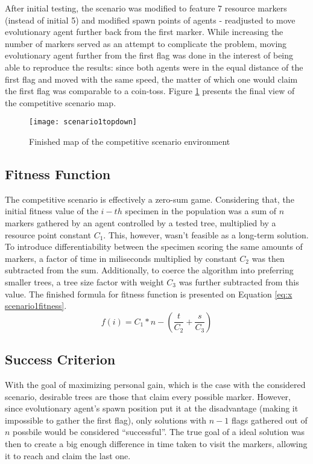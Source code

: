 After initial testing, the scenario was modified to feature 7 resource markers (instead of initial 5) and modified spawn points of agents -  readjusted to move evolutionary agent further back from the first marker. While increasing the number of markers served as an attempt to complicate the problem, moving evolutionary agent further from the first flag was done in the interest of being able to reproduce the results: since both agents were in the equal distance of the first flag and moved with the same speed, the matter of which one would claim the first flag was comparable to a coin-toss. Figure \ref{fig:x scenario1topdown} presents the final view of the competitive scenario map.

\begin{figure}[h]
    \centering
    \texttt{[image: scenario1topdown]}
    \caption{Finished map of the competitive scenario environment}
    \label{fig:x scenario1topdown}
\end{figure}

\subsection{Fitness Function}
The competitive scenario is effectively a zero-sum game. Considering that, the initial fitness value of the $i-th$ specimen in the population was a sum of $n$ markers gathered by an agent controlled by a tested tree, multiplied by a resource point constant $C_1$. This, however, wasn't feasible as a long-term solution. To introduce differentiability between the specimen scoring the same amounts of markers, a  factor of time in miliseconds multiplied by constant $C_2$ was then subtracted from the sum. Additionally, to coerce the algorithm into preferring smaller trees, a tree size factor with weight $C_3$ was further subtracted from this value. The finished formula for fitness function is presented on Equation \ref{eq:x scenario1fitness}.
\begin{equation}
    \label{eq:x scenario1fitness}
f(i) = C_1 * n - (\frac{t}{C_2} + \frac{s}{C_3})
\end{equation}
\subsection{Success Criterion}
With the goal of maximizing personal gain, which is the case with the considered scenario, desirable trees are those that claim every possible marker. However, since evolutionary agent's spawn position put it at the disadvantage (making it impossible to gather the first flag), only solutions with $n-1$ flags gathered out of $n$ possbile would be considered ``successful''. The true goal of a ideal solution was then to create a big enough difference in time taken to visit the markers, allowing it to reach and claim the last one.
